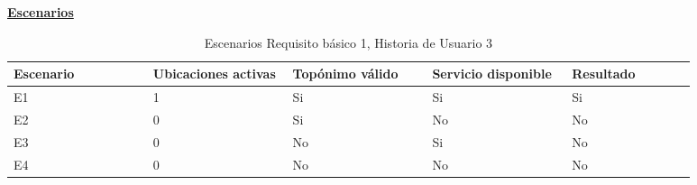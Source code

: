 \documentclass[../ei103948-project-documentation.tex]{subfiles}
\begin{document}
				\begin{center}
				\textbf{\underline{Escenarios}}
				\begin{table}[H]
					\centering
					\begin{tabular}{|p{0.18\linewidth}|p{0.18\linewidth}|p{0.18\linewidth}|p{0.18\linewidth}|p{0.16\linewidth}|}
						\hline
						\textbf{Escenario} & \textbf{Ubicaciones activas} & \textbf{Topónimo válido} & \textbf{Servicio disponible} & \textbf{Resultado} \\ \hline
						E1       & 1                        & Si                       & Si                           & Si                 \\ \hline
						E2        & 0                        & Si                       & No                           & No                 \\ \hline
						E3        & 0                        & No                       & Si                           & No                 \\ \hline
						E4                 & 0                        & No                       & No                           & No                 \\ \hline
						\end{tabular}
					\caption{Escenarios Requisito básico 1, Historia de Usuario 3}
				\end{table}

				\descripcionBasicaC


\end{center}
\end{document}
